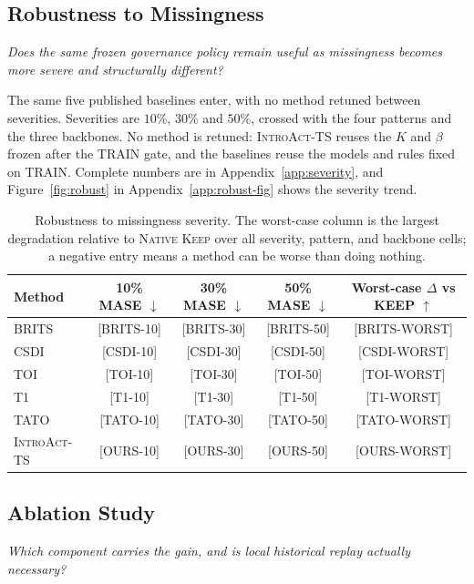 \documentclass{article}
\newcommand{\ph}[1]{\textcolor{phgray}{\textsf{[#1]}}}
\newcommand{\introact}{\textsc{IntroAct-TS}}
\begin{document}
\subsection{Robustness to Missingness}
\label{sec:exp-robust}
\emph{Does the same frozen governance policy remain useful as missingness becomes more
severe and structurally different?}

The same five published baselines enter, with no method retuned between severities.
Severities are $10\%$, $30\%$ and $50\%$, crossed with
the four patterns and the three backbones. No method is retuned: \introact{} reuses the
$K$ and $\beta$ frozen after the TRAIN gate, and the baselines reuse the models and rules
fixed on TRAIN. Complete numbers are in Appendix~\ref{app:severity}, and
Figure~\ref{fig:robust} in Appendix~\ref{app:robust-fig} shows the severity trend.

\begin{table}[t]
  \caption{Robustness to missingness severity. The worst-case column is the largest
  degradation relative to \textsc{Native Keep} over all severity, pattern, and backbone
  cells; a negative entry means a method can be worse than doing nothing.}
  \label{tab:robust}
  \centering
  \small
  \begin{tabular}{lcccc}
    \toprule
    Method & 10\% MASE $\downarrow$ & 30\% MASE $\downarrow$ & 50\% MASE $\downarrow$ & Worst-case $\Delta$ vs KEEP $\uparrow$ \\
    \midrule
    BRITS       & \ph{BRITS-10} & \ph{BRITS-30} & \ph{BRITS-50} & \ph{BRITS-WORST} \\
    CSDI        & \ph{CSDI-10}  & \ph{CSDI-30}  & \ph{CSDI-50}  & \ph{CSDI-WORST} \\
    TOI         & \ph{TOI-10}   & \ph{TOI-30}   & \ph{TOI-50}   & \ph{TOI-WORST} \\
    T1          & \ph{T1-10}    & \ph{T1-30}    & \ph{T1-50}    & \ph{T1-WORST} \\
    TATO        & \ph{TATO-10}  & \ph{TATO-30}  & \ph{TATO-50}  & \ph{TATO-WORST} \\
    \midrule
    \rowcolor{bestgray}\introact{} & \ph{OURS-10}  & \ph{OURS-30}  & \ph{OURS-50}  & \ph{OURS-WORST} \\
    \bottomrule
  \end{tabular}
\end{table}

\subsection{Ablation Study}
\label{sec:exp-ablation}
\emph{Which component carries the gain, and is local historical replay actually
necessary?}
\end{document}
